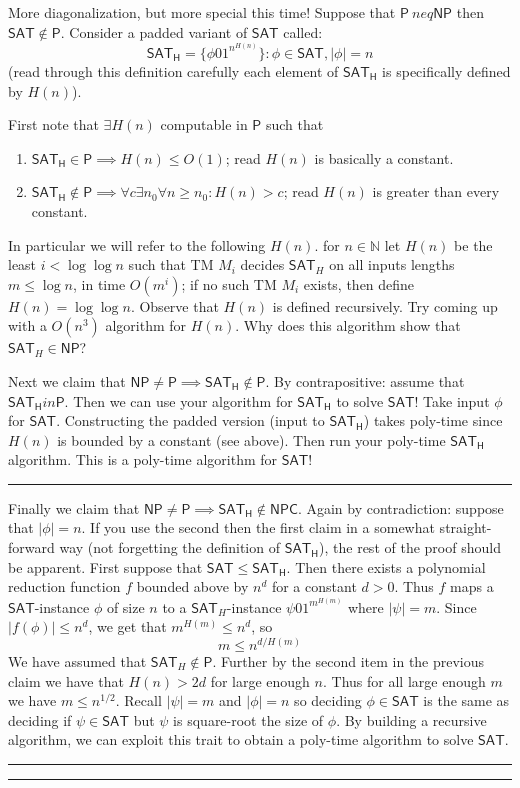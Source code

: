 \documentclass[twoside]{article}
\newenvironment{proof}{{\bf Proof:}}{\hfill\rule{2mm}{2mm}}
\def\N{\mathbb{N}}
\def\P{\mathsf{P}}
\def\NP{\mathsf{NP}}
\def\SAT{\mathsf{SAT}}
\begin{document}
\begin{proof}
More diagonalization, but more special this time! Suppose that $\P \ neq \NP$ then $\SAT \notin \P$. Consider a padded variant of $\SAT$ called:
\[\mathsf{SAT_H} = \{\phi 0 1^{n^{H(n)}}\}: \phi \in \mathsf{SAT}, |\phi| = n\]
(read through this definition carefully each element of $\mathsf{SAT_H}$ is specifically defined by $H(n)$).

First note that $\exists H(n)$ computable in $\mathsf{P}$ such that
\begin{enumerate}
\item $\mathsf{SAT_H} \in \mathsf{P} \implies H(n) \leq O(1)$; read $H(n)$ is basically a constant. 
\item $\mathsf{SAT_H} \notin \mathsf{P} \implies \forall c\exists n_0 \forall n\geq n_0: H(n) > c$; read $H(n)$ is greater than every constant.
\end{enumerate}
In particular we will refer to the following $H(n)$. for $n \in \N$ let $H(n)$ be the least $i < \log\log n$ such that TM $M_i$ decides $\SAT_H$ on all inputs lengths $m \leq \log n$, in time $O(m^i)$; if no such TM $M_i$ exists, then define $H(n) = \log\log n$. Observe that $H(n)$ is defined recursively. Try coming up with a $O(n^3)$ algorithm for $H(n)$. Why does this algorithm show that $\SAT_H \in \NP$?

Next we claim that $\mathsf{NP} \neq \mathsf{P} \implies \mathsf{SAT_H} \notin \mathsf{P}$.
\begin{proof}
By contrapositive: assume that $\mathsf{SAT_H} in \mathsf{P}$. Then we can use your algorithm for $\mathsf{SAT_H}$ to solve $\mathsf{SAT}$! Take input $\phi$ for $\SAT$. Constructing the padded version (input to $\mathsf{SAT_H}$) takes poly-time since $H(n)$ is bounded by a constant (see above). Then run your poly-time $\mathsf{SAT_H}$ algorithm. This is a poly-time algorithm for $\SAT$! 
\end{proof}

Finally we claim that $\mathsf{NP} \neq \mathsf{P} \implies \mathsf{SAT_H} \notin \mathsf{NPC}$. 
\begin{proof}
Again by contradiction: suppose that $|\phi| = n$. If you use the second then the first claim in a somewhat straight-forward way (not forgetting the definition of $\mathsf{SAT_H}$), the rest of the proof should be apparent. First suppose that $\mathsf{SAT} \leq \mathsf{SAT_H}$. Then there exists a polynomial reduction function $f$ bounded above by $n^d$ for a constant $d > 0$. Thus $f$ maps a $\SAT$-instance $\phi$ of size $n$ to a $\SAT_H$-instance $\psi 01^{m^{H(m)}}$ where $|\psi | = m$. Since $|f(\phi)| \leq n^d$, we get that $m^{H(m)} \leq n^d$, so 
\[m \leq n^{d/H(m)}\]
We have assumed that $\SAT_H \notin \P$. Further by the second item in the previous claim we have that $H(n) > 2d$ for large enough $n$. Thus for all large enough $m$ we have $m \leq n^{1/2}$. Recall $|\psi| = m$ and $|\phi| = n$ so deciding $\phi \in \SAT$ is the same as deciding if $\psi \in \SAT$ but $\psi$ is square-root the size of $\phi$. By building a recursive algorithm, we can exploit this trait to obtain a poly-time algorithm to solve $\SAT$.   
\end{proof}


\end{proof}
\end{document}
